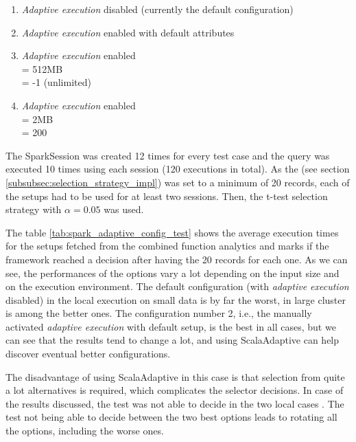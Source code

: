 \begin{enumerate}
	\item \textit{Adaptive execution} disabled (currently the default configuration)
	\item \textit{Adaptive execution} enabled with default attributes
	\item \textit{Adaptive execution} enabled\\
	 = 512MB\\
	 = -1 (unlimited)
	\item \textit{Adaptive execution} enabled\\
	 = 2MB\\
	 = 200
\end{enumerate}

The SparkSession was created 12 times for every test case and the query was executed 10 times using each session (120 executions in total). As the  (see section \ref{subsubsec:selection_strategy_impl}) was set to a minimum of 20 records, each of the setups had to be used for at least two sessions. Then, the t-test selection strategy with $\alpha = 0.05$ was used.

The table \ref{tab:spark_adaptive_config_test} shows the average execution times for the setups fetched from the combined function analytics and marks if the framework reached a decision after having the 20 records for each one. As we can see, the performances of the options vary a lot depending on the input size and on the execution environment. The default configuration (with \textit{adaptive execution} disabled) in the local execution on small data is by far the worst, in large cluster is among the better ones. The configuration number 2, i.e., the manually activated \textit{adaptive execution} with default setup, is the best in all cases, but we can see that the results tend to change a lot, and using ScalaAdaptive can help discover eventual better configurations.

The disadvantage of using ScalaAdaptive in this case is that selection from quite a lot alternatives is required, which complicates the selector decisions. In case of the results discussed, the test was not able to decide in the two local cases . The test not being able to decide between the two best options leads to rotating all the options, including the worse ones.

